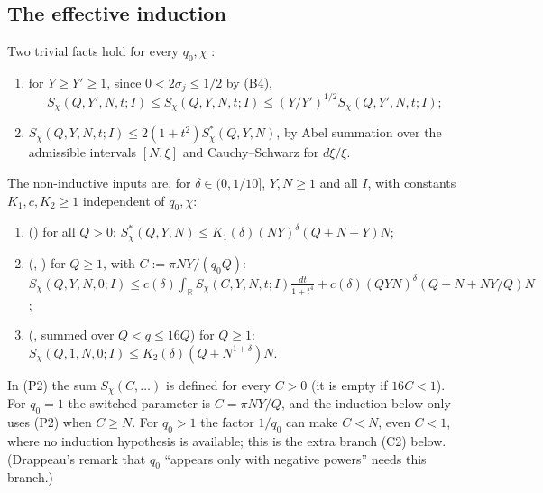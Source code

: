\documentclass[10pt,reqno]{amsart}
\theoremstyle{definition}
\numberwithin{equation}{section}
\newcommand{\R}{\mathbb R}
\begin{document}
\subsection{The effective induction}
Two trivial facts hold for every $q_0,\chi$ \cite[\S2]{TTL3}:
\begin{enumerate}
\item[(M)] for $Y\ge Y'\ge1$, since $0<2\sigma_j\le1/2$ by (B4),
\[S_\chi(Q,Y',N,t;I)\le S_\chi(Q,Y,N,t;I)\le(Y/Y')^{1/2}S_\chi(Q,Y',N,t;I);\]
\item[(PS)] $S_\chi(Q,Y,N,t;I)\le2(1+t^2)S_\chi^*(Q,Y,N)$, by Abel summation over the
admissible intervals $[N,\xi]$ and Cauchy--Schwarz for $d\xi/\xi$.
\end{enumerate}
The non-inductive inputs are, for $\delta\in(0,1/10]$, $Y,N\ge1$ and all
$I$, with constants $K_1,c,K_2\ge1$ independent of $q_0,\chi$:
\begin{enumerate}
\item[(P1)] (\cite[(8.7) and Theorem~14]{DI}) for all $Q>0$: $S_\chi^*(Q,Y,N)\le K_1(\delta)(NY)^\delta(Q+N+Y)N$;
\item[(P2)] (\cite[Lemma~8.1]{DI}, \cite[pp.~17--18]{Dr}) for $Q\ge1$, with
$C:=\pi NY/(q_0Q)$:
$S_\chi(Q,Y,N,0;I)\le c(\delta)\int_\R S_\chi(C,Y,N,t;I)\frac{dt}{1+t^4}+c(\delta)(QYN)^\delta(Q+N+NY/Q)N$;
\item[(P3)] (\cite[Theorem~2, (1.29)]{DI}, summed over $Q<q\le16Q$) for $Q\ge1$:
$S_\chi(Q,1,N,0;I)\le K_2(\delta)(Q+N^{1+\delta})N$.
\end{enumerate}
In (P2) the sum $S_\chi(C,\dots)$ is defined for every $C>0$ (it is empty if
$16C<1$). For $q_0=1$ the switched parameter is $C=\pi NY/Q$, and the
induction below only uses (P2) when $C\ge N$. For $q_0>1$ the factor $1/q_0$
can make $C<N$, even $C<1$, where no induction hypothesis is available;
this is the extra branch (C2) below. (Drappeau's remark that $q_0$
``appears only with negative powers'' needs this branch.)
\end{document}
